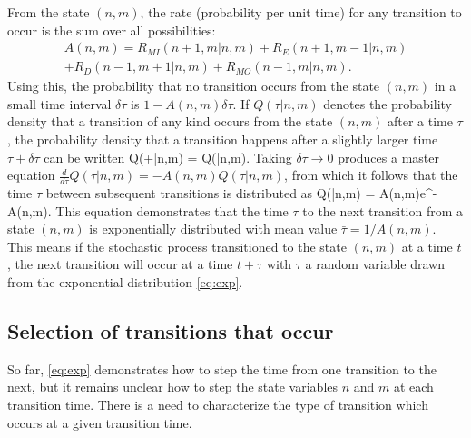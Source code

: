 From the state $(n,m)$, the rate (probability per unit time) for any transition to occur is the sum over all possibilities:
\begin{multline} A(n,m) = R_{MI}(n+1,m|n,m) + R_E(n+1,m-1|n,m) \\+ R_D(n-1,m+1|n,m) + R_{MO}(n-1,m|n,m).\end{multline}
Using this, the probability that no transition occurs from the state $(n,m)$ in a small time interval $\delta \tau$ is $1-A(n,m)\delta \tau$. If $Q(\tau|n,m)$ denotes the probability density that a transition of any kind occurs from the state $(n,m)$ after a time $\tau$, the probability density that a transition happens after a slightly larger time $\tau + \delta \tau$ can be written
\be Q(\tau+\delta \tau|n,m) = Q(\tau|n,m).\ee
Taking $\delta\tau \rightarrow 0 $ produces a master equation $\frac{d}{d\tau}Q(\tau|n,m) = -A(n,m)Q(\tau|n,m)$, from which it follows that the time $\tau$ between subsequent transitions is distributed as 
\be Q(\tau|n,m) = A(n,m)e^{-A(n,m)\tau}. \label{eq:exp}\ee
This equation demonstrates that the time $\tau$ to the next transition from a state $(n,m)$ is exponentially distributed with mean value $\bar{\tau} = 1/A(n,m).$ This means if the stochastic process transitioned to the state $(n,m)$ at a time $t$, the next transition will occur at a time $t+\tau$ with $\tau$ a random variable drawn from the exponential distribution \DIFaddbegin {}\DIFaddend \ref{eq:exp}.

\subsection{Selection of transitions that occur}
\DIFdelbegin %

\DIFdelend \DIFaddbegin \label{sec:brr}
\DIFaddend So far, \DIFdelbegin {}\DIFdelend \DIFaddbegin {}\DIFaddend \ref{eq:exp} demonstrates how to step the time from one transition to the next, but it remains unclear how to step the state variables $n$ and $m$ at each transition time. There is a need to characterize the type of transition which occurs at a given transition time.

